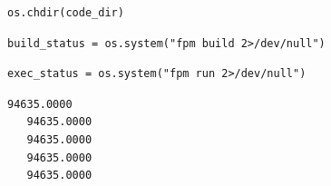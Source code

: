 \begin{verbatim}
os.chdir(code_dir)
\end{verbatim}

\begin{verbatim}
build_status = os.system("fpm build 2>/dev/null")
\end{verbatim}

\begin{verbatim}
exec_status = os.system("fpm run 2>/dev/null")
\end{verbatim}

\begin{verbatim}
94635.0000    
   94635.0000    
   94635.0000    
   94635.0000    
   94635.0000
\end{verbatim}